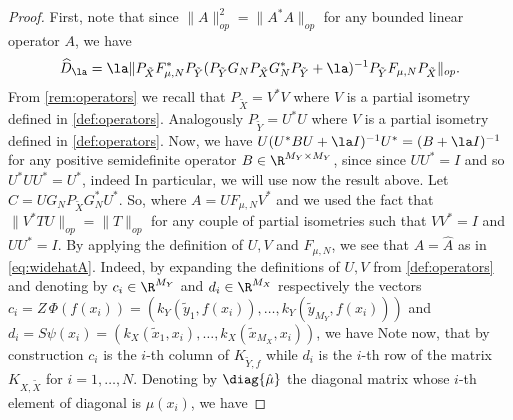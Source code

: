 \begin{proof}
First, note that since $\|A\|_{op}^2 = \|A^*A\|_{op}$ for any bounded linear operator $A$, we have
$$
\widehat{D}_\la = \la \|P_{\tilde{X}} F_{\mu, N}^* P_{\tilde{Y}} (P_{\tilde{Y}} G_N P_{\tilde{X}} G_N^*P_{\tilde{Y}} + \la)^{-1} P_{\tilde{Y}} F_{\mu, N} P_{\tilde{X}} \|_{op}.
$$
From \cref{rem:operators} we recall that $P_{\tilde X} = V^*V$ where $V$ is a partial isometry defined in \cref{def:operators}. Analogously $P_{\tilde Y} = U^*U$ where $V$ is a partial isometry defined in \cref{def:operators}.
Now, we have $U(U^*BU + \la I)^{-1}U^* = (B + \la I)^{-1}$ for any positive semidefinite operator $B \in \R^{M_Y \times M_Y}$, since since $UU^*=I$ and so $U^*UU^* = U^*$, indeed
In particular, we will use now the result above. Let $C = U G_N P_{\tilde{X}} G_N^* U^*$. So,
where $A = U F_{\mu, N} V^*$ and we used the fact that $\|V^* T U\|_{op} = \|T\|_{op}$ for any couple of partial isometries such that $VV^* = I$ and $UU^* = I$.
By applying the definition of $U, V$ and $F_{\mu, N}$, we see that $A = \widehat{A}$ as in \cref{eq:widehatA}.
Indeed, by expanding the definitions of $U, V$ from \cref{def:operators} and denoting by $c_i \in \R^{M_Y}$ and $d_i \in \R^{M_X}$ respectively the vectors
$c_i = Z\,\Phi(f(x_i)) = \left(k_Y(\tilde{y}_1,f(x_i)), \dots,  k_Y(\tilde{y}_{M_Y},f(x_i)) \right)$ and
$d_i = S\psi(x_i) = \left(k_X(\tilde{x}_1,x_i), \dots,  k_X(\tilde{x}_{M_X},x_i) \right)$, we have
Note now, that by construction $c_i$ is the $i$-th column of $K_{\tilde{Y},f}$ while $d_i$ is the $i$-th row of the matrix $K_{X,\tilde{X}}$ for $i=1,\dots,N$. Denoting by $\diag{\hat{\mu}}$ the diagonal matrix whose $i$-th element of diagonal is $\mu(x_i)$, we have

\end{proof}
